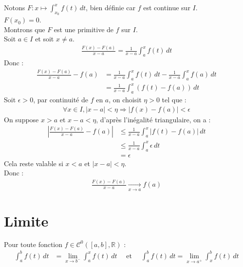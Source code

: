 \documentclass[../main.tex]{subfiles}
\begin{document}
\noindent Notons $F:x\mapsto \int_{x_0}^{x} f(t) \,dt$, bien définie car $f$ est continue sur $I$. \\
$F(x_0) = 0$. \\
Montrons que $F$ est une primitive de $f$ sur $I$. \\
Soit $a\in I$ et soit $x\neq a$. 
\begin{align*}
    \frac{F(x) - F(a)}{x - a} = \frac{1}{x - a} \int_{a}^{x} f(t) \,dt
\end{align*}
Donc : 
\begin{align*}
    \frac{F(x) - F(a)}{x - a} - f(a) &= \frac{1}{x - a} \int_{a}^{x} f(t) \,dt - \frac{1}{x - a} \int_{a}^{x} f(a) \,dt \\
    &= \frac{1}{x - a} \int_{a}^{x} (f(t) - f(a)) \,dt
\end{align*}
Soit $\epsilon > 0$, par continuité de $f$ en $a$, on choisit $\eta > 0$ tel que : 
\begin{align*}
    \forall x\in I, |x - a| < \eta \Rightarrow |f(x) - f(a)| < \epsilon
\end{align*}
On suppose $x > a$ et $x - a < \eta$, d'après l'inégalité triangulaire, on a : \\
\begin{align*}
    \left| \frac{F(x) - F(a)}{x - a} - f(a) \right| &\leq \frac{1}{x - a} \int_{a}^{x} |f(t) - f(a)| \,dt \\
    &\leq \frac{1}{x - a} \int_{a}^{x} \epsilon \,dt \\
    &= \epsilon
\end{align*}
Cela reste valable si $x < a$ et $|x - a| < \eta$. \\
Donc : 
\begin{align*}
    \frac{F(x) - F(a)}{x - a} \underset{x \to a}{\longrightarrow} f(a)
\end{align*}

\section{Limite}
\begin{tcolorbox}[title=Propostion 26.66, title filled=false, colframe=lightblue, colback=lightblue!10!white]
    Pour toute fonction $f\in \mathcal{C}^0([a, b], \mathbb{R})$ : 
    \begin{align*}
        \int_{a}^{b} f(t) \,dt &= \lim_{x\to b^-} \int_{a}^{x} f(t) \,dt \quad\text{ et }\quad \int_{a}^{b} f(t) \,dt = \lim_{x\to a^+} \int_{x}^{b} f(t) \,dt
    \end{align*}
\end{tcolorbox}
\end{document}
